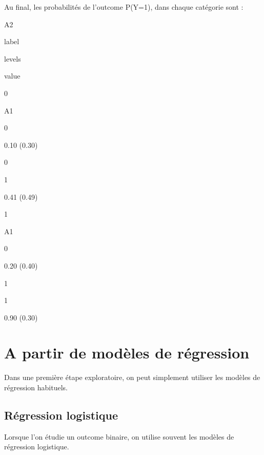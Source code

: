 \documentclass[
]{book}
\newenvironment{Shaded}{\begin{snugshade}}{\end{snugshade}}
\newcommand{\AttributeTok}[1]{\textcolor[rgb]{0.77,0.63,0.00}{#1}}
\newcommand{\CommentTok}[1]{\textcolor[rgb]{0.56,0.35,0.01}{\textit{#1}}}
\newcommand{\DecValTok}[1]{\textcolor[rgb]{0.00,0.00,0.81}{#1}}
\newcommand{\DocumentationTok}[1]{\textcolor[rgb]{0.56,0.35,0.01}{\textbf{\textit{#1}}}}
\newcommand{\FunctionTok}[1]{\textcolor[rgb]{0.00,0.00,0.00}{#1}}
\newcommand{\NormalTok}[1]{#1}
\newcommand{\OtherTok}[1]{\textcolor[rgb]{0.56,0.35,0.01}{#1}}
\newcommand{\SpecialCharTok}[1]{\textcolor[rgb]{0.00,0.00,0.00}{#1}}
\begin{document}
\begin{Shaded}
\end{Shaded}

Au final, les probabilités de l'outcome P(Y=1), dans chaque catégorie sont :

A2

label

levels

value

0

A1

0

0.10 (0.30)

0

1

0.41 (0.49)

1

A1

0

0.20 (0.40)

1

1

0.90 (0.30)

\hypertarget{regression}{%
\chapter{A partir de modèles de régression}\label{regression}}

Dans une première étape exploratoire, on peut simplement utiliser les modèles de régression habituels.

\hypertarget{ruxe9gression-logistique}{%
\section{Régression logistique}\label{ruxe9gression-logistique}}

Lorsque l'on étudie un outcome binaire, on utilise souvent les modèles de régression logistique.
\end{document}
